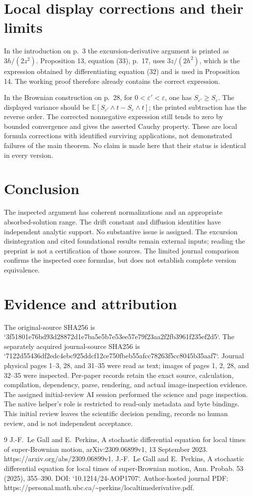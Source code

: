 \documentclass[10pt]{article}
\begin{document}
\section*{Local display corrections and their limits}
In the introduction on p. 3 the excursion-derivative argument is printed as \(3h/(2z^2)\). Proposition 13, equation (33), p. 17, uses \(3z/(2h^2)\), which is the expression obtained by differentiating equation (32) and is used in Proposition 14. The working proof therefore already contains the correct expression.\par
In the Brownian construction on p. 28, for \(0<\varepsilon'<\varepsilon\), one has \(S_{\varepsilon'}\geq S_\varepsilon\). The displayed variance should be \(\mathbb E[S_{\varepsilon'}\wedge t-S_\varepsilon\wedge t]\); the printed subtraction has the reverse order. The corrected nonnegative expression still tends to zero by bounded convergence and gives the asserted Cauchy property. These are local formula corrections with identified surviving applications, not demonstrated failures of the main theorem. No claim is made here that their status is identical in every version.\par
\section*{Conclusion}
The inspected argument has coherent normalizations and an appropriate absorbed-solution range. The drift constant and diffusion identities have independent analytic support. No substantive issue is assigned. The excursion disintegration and cited foundational results remain external inputs; reading the preprint is not a certification of those sources. The limited journal comparison confirms the inspected core formulas, but does not establish complete version equivalence.\par
\section*{Evidence and attribution}
The original-source SHA256 is `3f51801e76bd93d28872d1e7ba5e5b7e53ee57e79f23aa2f2fb3961f235ef2d5`. The separately acquired journal-source SHA256 is `7122d55436df2edc4ebc925ddcf12ce750fbeb55afcc78263f5cc8045b35aaf7`. Journal physical pages 1–3, 28, and 31–35 were read as text; images of pages 1, 2, 28, and 32–35 were inspected. Per-paper records retain the exact source, calculation, compilation, dependency, parse, rendering, and actual image-inspection evidence. The assigned initial-review AI session performed the science and page inspection. The native helper’s role is restricted to read-only metadata and byte bindings. This initial review leaves the scientific decision pending, records no human review, and is not independent acceptance.\par
9 J.-F. Le Gall and E. Perkins, A stochastic differential equation for local times of super-Brownian motion, arXiv:2309.06899v1, 13 September 2023. https://arxiv.org/abs/2309.06899v1. J.-F. Le Gall and E. Perkins, A stochastic differential equation for local times of super-Brownian motion, Ann. Probab. 53 (2025), 355–390. DOI: `10.1214/24-AOP1707`. Author-hosted journal PDF: https://personal.math.ubc.ca/\textasciitilde{}perkins/localtimederivative.pdf.\par
\end{document}
